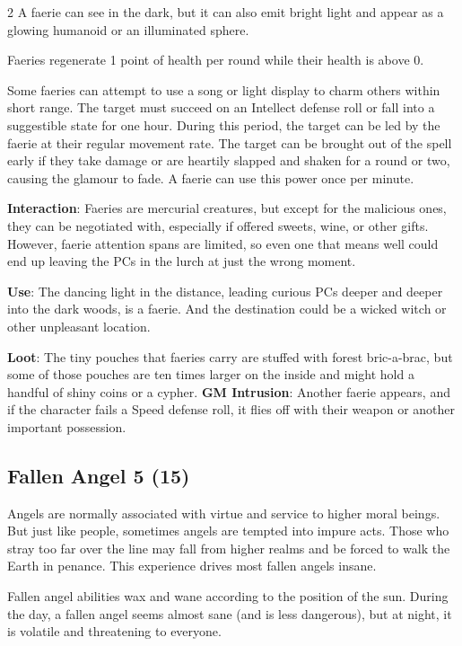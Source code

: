 \begin{multicols}{2}
A faerie can see in the dark, but it can also emit bright light and appear as a glowing humanoid or an illuminated sphere. 

Faeries regenerate 1 point of health per round while their health is above 0. 

Some faeries can attempt to use a song or light display to charm others within short range. The target must succeed on an Intellect defense roll or fall into a suggestible state for one hour. During this period, the target can be led by the faerie at their regular movement rate. The target can be brought out of the spell early if they take damage or are heartily slapped and shaken for a round or two, causing the glamour to fade. A faerie can use this power once per minute. 

\textbf{Interaction}: Faeries are mercurial creatures, but except for the malicious ones, they can be negotiated with, especially if offered sweets, wine, or other gifts. However, faerie attention spans are limited, so even one that means well could end up leaving the PCs in the lurch at just the wrong moment. 

\textbf{Use}: The dancing light in the distance, leading curious PCs deeper and deeper into the dark woods, is a faerie. And the destination could be a wicked witch or other unpleasant location.

\textbf{Loot}: The tiny pouches that faeries carry are stuffed with forest bric-a-brac, but some of those pouches are ten times larger on the inside and might hold a handful of shiny coins or a cypher.
\textbf{GM Intrusion}: Another faerie appears, and if the character fails a Speed defense roll, it flies off with their weapon or another
important possession.

\subsection{Fallen Angel	5 (15)}

Angels are normally associated with virtue and service to higher moral beings. But just like people, sometimes angels are tempted into impure acts. Those who stray too far over the line may fall from higher realms and be forced to walk the Earth in penance. This experience drives most fallen angels insane.

Fallen angel abilities wax and wane according to the position of the sun. During the day, a fallen angel seems almost sane (and is less dangerous), but at night, it is volatile and threatening to everyone.


\end{multicols}
